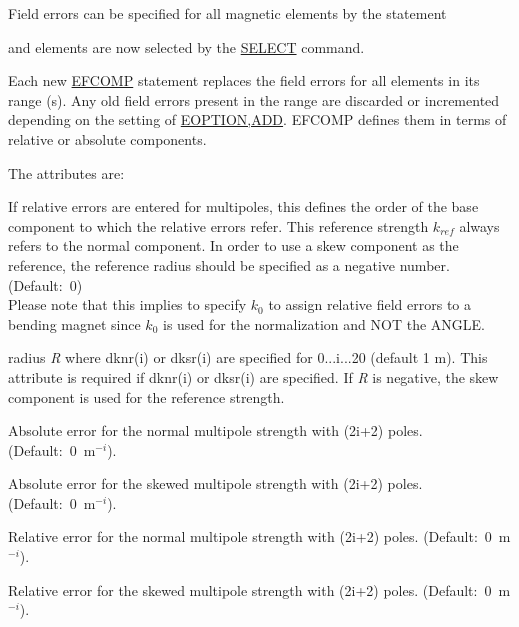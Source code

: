 Field errors can be specified for all magnetic elements by the statement  


and elements are now selected by the
\href{../Introduction/select.html}{SELECT} command. 

Each new
\href{efcomp}{EFCOMP} statement replaces the field errors for all
elements in its range (s). Any old field errors present in the range are
discarded or incremented depending on the setting of
\href{error_option.html}{EOPTION,ADD}. EFCOMP defines them in terms of
relative or absolute components.  

The attributes are: 
\begin{madlist}
   If relative errors are entered for multipoles, this defines
  the order of the base component to which the relative  errors
  refer. This reference strength $k_{ref}$ always refers to the
  normal component. In order to use a skew component as the reference, the
  reference radius should be specified as a negative number. (Default:~0)  \\
  Please note that this implies to specify $k_0$ to assign
  relative field errors to a bending magnet since $k_0$ is used
  for the normalization and NOT the ANGLE. 

   radius \textit{R} where dknr(i) or dksr(i) are specified
  for 0...i...20 (default 1 m). This attribute is required if dknr(i) or
  dksr(i) are specified. If \textit{R} is negative, the skew component is
  used for the reference strength.  

   Absolute error for the normal multipole strength with
  (2i+2) poles. (Default:~0~m$^{-i}$).  

   Absolute error for the skewed multipole strength with
  (2i+2) poles. (Default:~0~m$^{-i}$).  

   Relative error for the normal multipole strength with
  (2i+2) poles. (Default:~0~m$^{-i}$).  

   Relative error for the skewed multipole strength with
  (2i+2) poles. (Default:~0~m$^{-i}$).  
\end{madlist}


